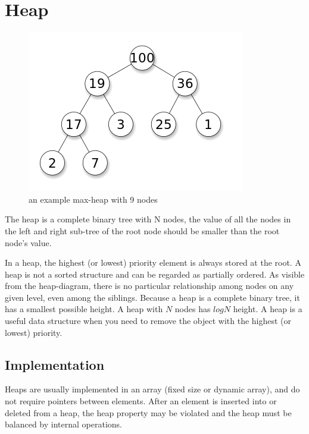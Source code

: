 \documentclass[12pt]{article}
\begin{document}
\section{Heap}

    \begin{figure}
      \centering
      \includegraphics[width=\linewidth/2]{360px-Max-Heap.png}
     \caption{ an example max-heap with 9 nodes}
    \end{figure}
     The heap is a complete binary tree with N nodes, the value of all the nodes in the left and right sub-tree of the root node should be smaller than the root node's value. 
     
     In a heap, the highest (or lowest) priority element is always stored at the root. A heap is not a sorted structure and can be regarded as partially ordered. As visible from the heap-diagram, there is no particular relationship among nodes on any given level, even among the siblings. Because a heap is a complete binary tree, it has a smallest possible height. A heap with $N$ nodes has $logN$ height. A heap is a useful data structure when you need to remove the object with the highest (or lowest) priority. \cite{6,7}
     
     \subsection{Implementation}
     Heaps are usually implemented in an array (fixed size or dynamic array), and do not require pointers between elements. After an element is inserted into or deleted from a heap, the heap property may be violated and the heap must be balanced by internal operations.
     
\end{document}
